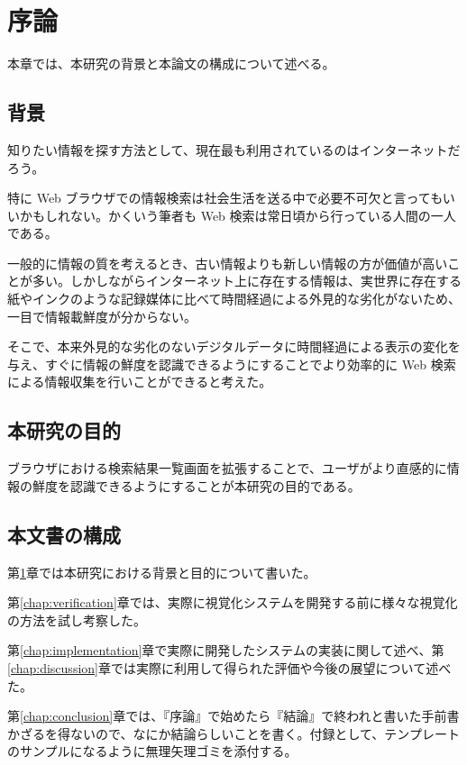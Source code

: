 \chapter{序論}
\label{chap:introduction}

本章では、本研究の背景と本論文の構成について述べる。

\section{背景}

知りたい情報を探す方法として、現在最も利用されているのはインターネットだろう。

特に Web ブラウザでの情報検索は社会生活を送る中で必要不可欠と言ってもいいかもしれない。かくいう筆者も Web 検索は常日頃から行っている人間の一人である。

一般的に情報の質を考えるとき、古い情報よりも新しい情報の方が価値が高いことが多い。しかしながらインターネット上に存在する情報は、実世界に存在する紙やインクのような記録媒体に比べて時間経過による外見的な劣化がないため、一目で情報載鮮度が分からない。

そこで、本来外見的な劣化のないデジタルデータに時間経過による表示の変化を与え、すぐに情報の鮮度を認識できるようにすることでより効率的に Web 検索による情報収集を行いことができると考えた。

\section{本研究の目的}

ブラウザにおける検索結果一覧画面を拡張することで、ユーザがより直感的に情報の鮮度を認識できるようにすることが本研究の目的である。

\section{本文書の構成}

第\ref{chap:introduction}章では本研究における背景と目的について書いた。

第\ref{chap:verification}章では、実際に視覚化システムを開発する前に様々な視覚化の方法を試し考察した。

第\ref{chap:implementation}章で実際に開発したシステムの実装に関して述べ、第\ref{chap:discussion}章では実際に利用して得られた評価や今後の展望について述べた。

第\ref{chap:conclusion}章では、『序論』で始めたら『結論』で終われと書いた手前書かざるを得ないので、なにか結論らしいことを書く。付録として、テンプレートのサンプルになるように無理矢理ゴミを添付する。
